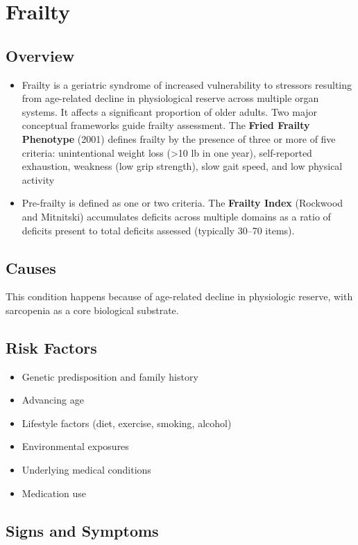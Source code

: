 \chapter{Frailty}
\label{sec:Frailty}

\section{Overview}


\begin{itemize}[noitemsep]
  \item Frailty is a geriatric syndrome of increased vulnerability to stressors resulting from age-related decline in physiological reserve across multiple organ systems. It affects a significant proportion of older adults. Two major conceptual frameworks guide frailty assessment. The \textbf{Fried Frailty Phenotype} (2001) defines frailty by the presence of three or more of five criteria: unintentional weight loss (>10 lb in one year), self-reported exhaustion, weakness (low grip strength), slow gait speed, and low physical activity
  \item Pre-frailty is defined as one or two criteria. The \textbf{Frailty Index} (Rockwood and Mitnitski) accumulates deficits across multiple domains as a ratio of deficits present to total deficits assessed (typically 30--70 items).
\end{itemize}
\section{Causes}
This condition happens because of age-related decline in physiologic reserve, with sarcopenia as a core biological substrate.     
\section{Risk Factors}

\begin{itemize}[noitemsep]
  \item Genetic predisposition and family history
  \item Advancing age
  \item Lifestyle factors (diet, exercise, smoking, alcohol)
  \item Environmental exposures
  \item Underlying medical conditions
  \item Medication use
\end{itemize}
\section{Signs and Symptoms}

